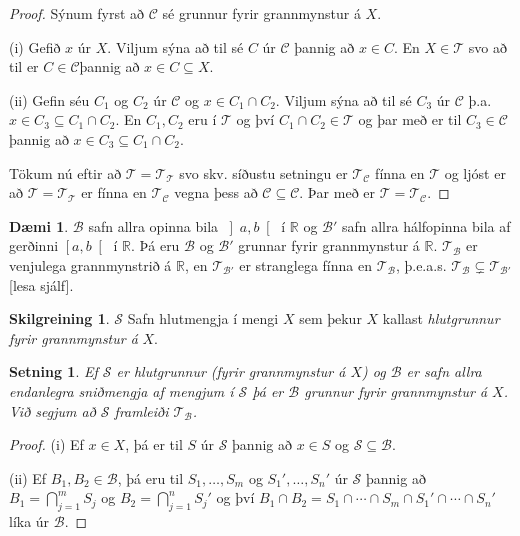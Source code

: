 \documentclass[a4paper,icelandic]{book}
\theoremstyle{definition}
\newtheorem{skilgr}{Skilgreining}[section]
\newtheorem{daemi}{Dæmi}[section]
\theoremstyle{plain}
\newtheorem{setn}{Setning}[section]
\theoremstyle{remark}
\newcommand{\R}{\mathbb{R}} %
\begin{document}
\begin{proof}
  Sýnum fyrst að $\mathcal C$ sé grunnur fyrir grannmynstur á $X$.

  (i) Gefið $x$ úr $X$. Viljum sýna að til sé $C$ úr $\mathcal C$ þannig að
  $x\in C$.  En $X\in \mathcal T$ svo að til er $C\in \mathcal C$þannig að $x\in
  C\subseteq X$.

  (ii) Gefin séu $C_1$ og $C_2$ úr $\mathcal C$ og $x\in C_1\cap C_2$. Viljum
  sýna að til sé $C_3$ úr $\mathcal C$ þ.a. $x\in C_3\subseteq C_1\cap C_2$. En
  $C_1,C_2$ eru í $\mathcal T$ og því $C_1\cap C_2 \in \mathcal T$ og þar með er
  til $C_3\in \mathcal C$ þannig að $x\in C_3\subseteq C_1\cap C_2$.

  Tökum nú eftir að $\mathcal T = \mathcal T_{\mathcal T}$ svo skv. síðustu
  setningu er $\mathcal T_{\mathcal C}$ fínna en $\mathcal T$ og ljóst er að
  $\mathcal T = \mathcal T_{\mathcal T}$ er fínna en $\mathcal T_{\mathcal C}$
  vegna þess að $\mathcal C\subseteq \mathcal C$. Þar með er $\mathcal T =
  \mathcal T_{\mathcal C}$.
\end{proof}
\begin{daemi}
  $\mathcal B$ safn allra opinna bila $\left] a,b\right[$ í $\R$ og $\mathcal
  B'$ safn allra hálfopinna bila af gerðinni $\left[a,b\right[$ í $\R$. Þá eru
  $\mathcal B$ og $\mathcal B'$ grunnar fyrir grannmynstur á $\R$. $\mathcal
  T_{\mathcal B}$ er venjulega grannmynstrið á $\R$, en $\mathcal T_{\mathcal
    B'}$ er stranglega fínna en $\mathcal T_{\mathcal B}$, þ.e.a.s. $\mathcal
  T_{\mathcal B} \subsetneq \mathcal T_{\mathcal B'}$ [lesa sjálf].
\end{daemi}
\begin{skilgr}
  $\mathcal S$ Safn hlutmengja í mengi $X$ sem þekur $X$ kallast
  \emph{hlutgrunnur fyrir grannmynstur
    á} $X$.
\end{skilgr}
\begin{setn}
  Ef $\mathcal S$ er hlutgrunnur (fyrir grannmynstur á $X$) og $\mathcal B$ er
  safn allra endanlegra sniðmengja af mengjum í $\mathcal S$ þá er $\mathcal B$
  grunnur fyrir grannmynstur á $X$. Við segjum að $\mathcal S$
  \emph{framleiði} $\mathcal T_{\mathcal B}$.
\end{setn}
\begin{proof}
  (i) Ef $x\in X$, þá er til $S$ úr $\mathcal S$ þannig að $x\in S$ og $\mathcal
  S\subseteq \mathcal B$.

  (ii) Ef $B_1,B_2\in \mathcal B$, þá eru til $S_1,\dots,S_m$ og
  $S_1',\dots,S_n'$ úr $\mathcal S$ þannig að $B_1 = \bigcap_{j=1}^m S_j$ og
  $B_2 = \bigcap_{j=1}^n S_j'$ og því $B_1\cap B_2 = S_1 \cap\cdots\cap S_m \cap
  S_1'\cap \cdots \cap S_n'$ líka úr $\mathcal B$.
\end{proof}
\end{document}
